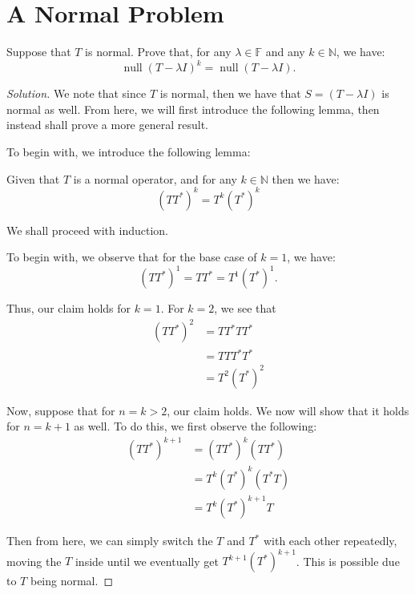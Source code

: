 \documentclass{article}
\newenvironment{solution}{\begin{proof}[Solution]}{\end{proof}}
\renewcommand\qedsymbol{$\blacksquare$}
\newenvironment{innerproof}{\renewcommand{\qedsymbol}{$\square$}\proof}{\endproof}
\newcommand{\NN}{\mathbb{N}}
\DeclareMathOperator*{\vnull}{\mathrm{null}}
\begin{document}
\section{A Normal Problem}
\begin{hw}
	Suppose that $T$ is normal. Prove that, for any $\lambda \in \mathbb{F}$ and any $k \in \NN$, we have:
	\begin{equation*}
		\vnull (T-\lambda I)^{k} = \vnull (T-\lambda I).
	\end{equation*}
\end{hw}
\begin{solution}
	We note that since $T$ is normal, then we have that $S = (T - \lambda I)$ is normal as well. From here, we will first introduce the following lemma, then instead shall prove a more general result.
	
	To begin with, we introduce the following lemma:
	\begin{lem}
		Given that $T$ is a normal operator, and for any $k \in \NN$ then we have:
		\begin{equation*}
			(TT^{*})^{k} = T^{k}(T^{*})^{k}
		\end{equation*}
	\end{lem}
	\begin{innerproof}
		We shall proceed with induction.
		
		To begin with, we observe that for the base case of $k = 1$, we have:
		\begin{equation*}
			(TT^{*})^{1} = TT^{*} = T^{1}(T^{*})^{1}.
		\end{equation*}
	
		Thus, our claim holds for $k = 1$. For $k = 2$, we see that
		\begin{align*}
			(TT^{*})^{2} &= TT^{*}TT^{*} \\
			&= TTT^{*}T^{*} \\
			&= T^{2}(T^{*})^{2}
		\end{align*}
		
		Now, suppose that for $n = k > 2$, our claim holds. We now will show that it holds for $n = k + 1$ as well. To do this, we first observe the following:
		\begin{align*}
			(TT^{*})^{k+1} &= (TT^{*})^{k}(TT^{*}) \\
			&= T^{k}(T^{*})^{k}(T^{*}T) \\
			&= T^{k}(T^{*})^{k+1}T
		\end{align*}
	
		Then from here, we can simply switch the $T$ and $T^{*}$ with each other repeatedly, moving the $T$ inside until we eventually get $T^{k+1}(T^{*})^{k+1}$. This is possible due to $T$ being normal.
		

\end{innerproof}
\end{solution}
\end{document}
